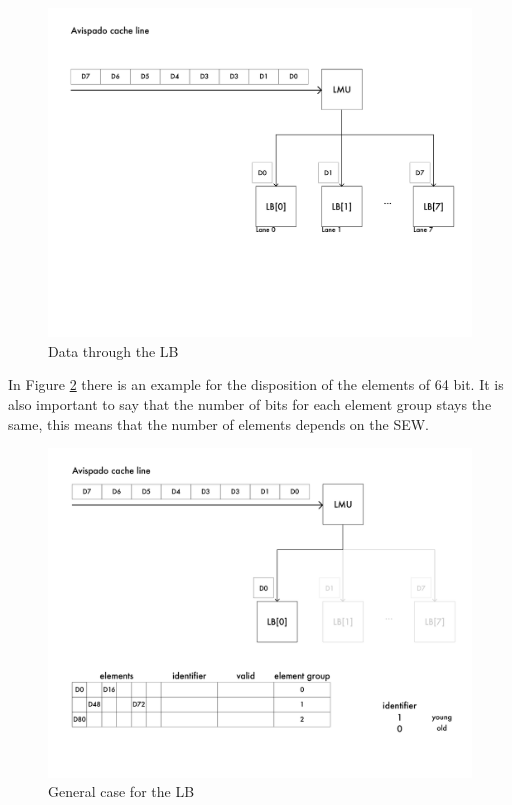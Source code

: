 \begin{figure}[H]
    \centering
    \includegraphics[scale = 0.5]{Chapter_2/img/cache-to-lb-gen-ex.png}
    \caption{Data through the LB}
    \label{gen-ex}
\end{figure}


In Figure \ref{lb-genz} there is an example for the disposition of the elements of 64 bit. It is also important to say that the number of bits for each element group stays the same, this means that the number of elements depends on the SEW.\\


\begin{figure}[H]
    \centering
    \includegraphics[scale = 0.4]{Chapter_2/img/cache-to-lb-genz-ex.png}
    \caption{General case for the LB}
    \label{lb-genz}
\end{figure}

